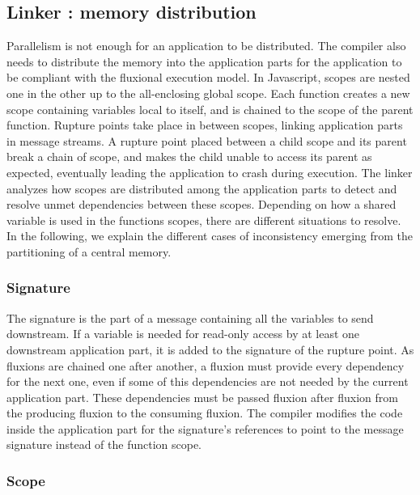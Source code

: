 \subsection{Linker : memory distribution} \label{section:linker}

Parallelism is not enough for an application to be distributed.
The compiler also needs to distribute the memory into the application parts for the application to be compliant with the fluxional execution model.
In Javascript, scopes are nested one in the other up to the all-enclosing global scope.
Each function creates a new scope containing variables local to itself, and is chained to the scope of the parent function.
Rupture points take place in between scopes, linking application parts in message streams.
A rupture point placed between a child scope and its parent break a chain of scope, and makes the child unable to access its parent as expected, eventually leading the application to crash during execution.
The linker analyzes how scopes are distributed among the application parts to detect and resolve unmet dependencies between these scopes.
Depending on how a shared variable is used in the functions scopes, there are different situations to resolve.
In the following, we explain the different cases of inconsistency emerging from the partitioning of a central memory.

\subsubsection{Signature}

The signature is the part of a message containing all the variables to send downstream.
If a variable is needed for read-only access by at least one downstream application part, it is added to the signature of the rupture point.
As fluxions are chained one after another, a fluxion must provide every dependency for the next one, even if some of this dependencies are not needed by the current application part.
These dependencies must be passed fluxion after fluxion from the producing fluxion to the consuming fluxion.
The compiler modifies the code inside the application part for the signature's references to point to the message signature instead of the function scope.

\subsubsection{Scope}

